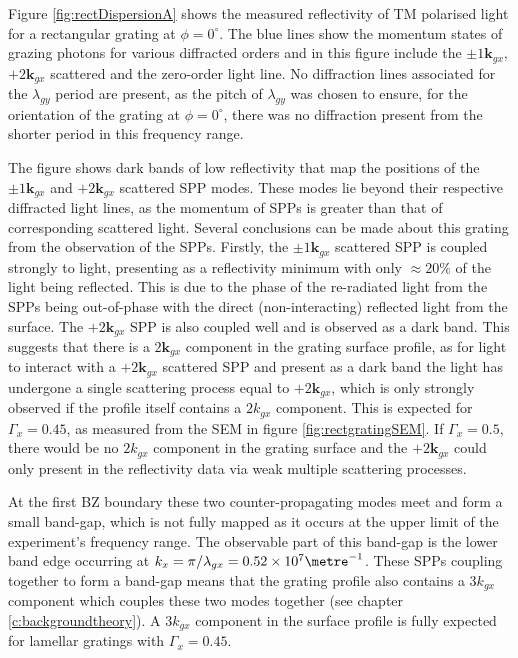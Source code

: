 Figure \ref{fig:rectDispersionA} shows the measured reflectivity of TM polarised light for a rectangular grating at $\phi=0^\circ$. The blue lines show the momentum states of grazing photons for various diffracted orders and in this figure include the $\pm1\mathbf{k}_{gx}$, $+2\mathbf{k}_{gx}$ scattered and the zero-order light line. No diffraction lines associated for the $\lambda_{gy}$ period are present, as the pitch of $\lambda_{gy}$ was chosen to ensure, for the orientation of the grating at $\phi=0^\circ$, there was no diffraction present from the shorter period in this frequency range. 

The figure shows dark bands of low reflectivity that map the positions of the $\pm1\mathbf{k}_{gx}$ and $+2\mathbf{k}_{gx}$ scattered SPP modes. These modes lie beyond their respective diffracted light lines, as the momentum of SPPs is greater than that of corresponding scattered light. Several conclusions can be made about this grating from the observation of the SPPs. Firstly, the $\pm1\mathbf{k}_{gx}$ scattered SPP is coupled strongly to light, presenting as a reflectivity minimum with only $\approx 20\%$ of the light being reflected. This is due to the phase of the re-radiated light from the SPPs being out-of-phase with the direct (non-interacting) reflected light from the surface. The $+2\mathbf{k}_{gx}$ SPP is also coupled well and is observed as a dark band. This suggests that there is a  $2\mathbf{k}_{gx}$ component in the grating surface profile, as for light to interact with a $+2\mathbf{k}_{gx}$ scattered SPP and present as a dark band the light has undergone a single scattering process equal to $+2\mathbf{k}_{gx}$, which is only strongly observed if the profile itself contains a $2k_{gx}$ component. This is expected for $\Gamma_x = 0.45$, as measured from the SEM in figure \ref{fig:rectgratingSEM}. If $\Gamma_x=0.5$, there would be no $2k_{gx}$ component in the grating surface and the $+2\mathbf{k}_{gx}$ could only present in the reflectivity data via weak multiple scattering processes. 

At the first BZ boundary these two counter-propagating modes meet and form a small band-gap, which is not fully mapped as it occurs at the upper limit of the experiment's frequency range. The observable part of this band-gap is the lower band edge occurring at $k_x=\pi/\lambda_{gx}=0.52\times 10^7 \metre^{-1}$. These SPPs coupling together to form a band-gap means that the grating profile also contains a $3k_{gx}$ component which couples these two modes together (see chapter \ref{c:backgroundtheory}). A $3k_{gx}$ component in the surface profile is fully expected for lamellar gratings with $\Gamma_x=0.45$.

